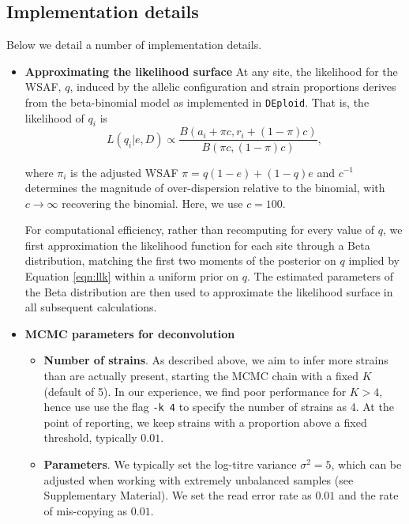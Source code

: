 \documentclass[9pt]{article}
\begin{document}
\subsection{Implementation details}

Below we detail a number of implementation details.

\begin{itemize}


\item {\bf Approximating the likelihood surface}
At any site, the likelihood for the WSAF, $q$, induced by the allelic configuration and strain proportions derives from the beta-binomial model as implemented in \texttt{DEploid}.  That is, the likelihood of $q_i$ is
\begin{equation}
L(q_{i}| e, D) \propto \frac{B(a_i + \pi c, r_i + (1-\pi) c)}{B(\pi c, (1-\pi) c)}, \label{eqn:llk}
\end{equation}

\noindent where $\pi_i$ is the adjusted WSAF $\pi = q(1-e)+(1-q)e$ and $c^{-1}$ determines the magnitude of over-dispersion relative to the binomial, with $c \to \infty$ recovering the binomial.  Here, we use $c=100$.

For computational efficiency, rather than recomputing for every value of $q$, we first approximation the likelihood function for each site through a Beta distribution, matching the first two moments of the posterior on $q$ implied by Equation \ref{eqn:llk} within a uniform prior on $q$.  The estimated parameters of the Beta distribution are then used to approximate the likelihood surface in all subsequent calculations.


\item {\bf MCMC parameters for deconvolution}

\begin{itemize}
\item {\bf Number of strains}. As described above, we aim to infer more strains than are actually present, starting the MCMC chain with a fixed $K$ (default of 5). In our experience, we find poor performance for $K>4$, hence use use the flag {\tt -k 4} to specify the number of strains as 4. At the point of reporting, we keep strains with a proportion above a fixed threshold, typically $0.01$.

\item {\bf Parameters}. We typically set the log-titre variance $\sigma^2 = 5$, which can be adjusted when working with extremely unbalanced samples (see \citet{Zhu2017} Supplementary Material).  We set the read error rate as $0.01$ and the rate of mis-copying as $0.01$.


\end{itemize}
\end{itemize}
\end{document}
